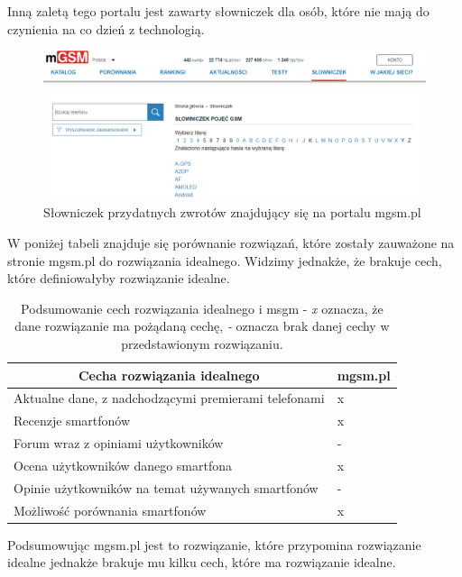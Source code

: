 Inną zaletą tego portalu jest zawarty słowniczek dla osób, które nie mają do czynienia na co dzień z technologią. 
\begin{figure}[H]
    \centering
    \includegraphics[width=15cm]{img/mgsm/dictonary.png}
    \caption{Słowniczek przydatnych zwrotów znajdujący się na portalu mgsm.pl}
    \label{mgsm_4}
\end{figure}
W poniżej tabeli znajduje się porównanie rozwiązań, które zostały zauważone na stronie mgsm.pl do rozwiązania idealnego. Widzimy jednakże, że brakuje cech, które definiowałyby rozwiązanie idealne.
\begin{table}[H]
\centering
\begin{tabular}{|l|l|}
    \hline
    \multicolumn{1}{|c|}{Cecha rozwiązania idealnego}    & \multicolumn{1}{c|}{mgsm.pl} \\ \hline
    Aktualne dane, z nadchodzącymi premierami telefonami & x                             \\ \hline
    Recenzje smartfonów                                  & x                                \\ \hline
    Forum wraz z opiniami użytkowników                   & -                                \\ \hline
    Ocena użytkowników danego smartfona                  & x                             \\ \hline
    Opinie użytkowników na temat używanych smartfonów    & -                                 \\ \hline
    Możliwość porównania smartfonów                      & x                                \\ \hline
\end{tabular}
\caption{Podsumowanie cech rozwiązania idealnego i msgm - \textit{x} oznacza, że dane rozwiązanie ma pożądaną cechę, \textit{-} oznacza brak danej cechy w przedstawionym rozwiązaniu.}
\label{comparison_mgsm}
\end{table}
Podsumowując mgsm.pl jest to rozwiązanie, które przypomina rozwiązanie idealne jednakże brakuje mu kilku cech, które ma rozwiązanie idealne.

